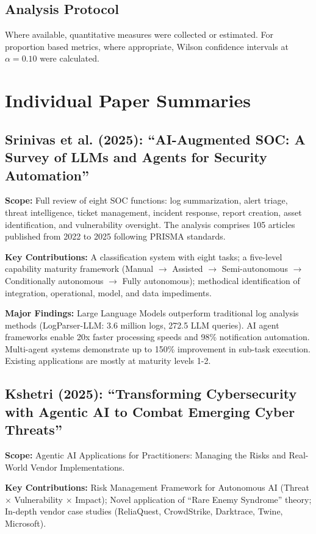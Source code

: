 \documentclass[journal]{IEEEtran}
\begin{document}
\subsection{Analysis Protocol}
Where available, quantitative measures were collected or estimated. For proportion based metrics, where appropriate, Wilson confidence intervals at $\alpha=0.10$ were calculated.

\section{Individual Paper Summaries}

\subsection{Srinivas et al. (2025): ``AI-Augmented SOC: A Survey of LLMs and Agents for Security Automation''}

\textbf{Scope:} Full review of eight SOC functions: log summarization, alert triage, threat intelligence, ticket management, incident response, report creation, asset identification, and vulnerability oversight. The analysis comprises 105 articles published from 2022 to 2025 following PRISMA standards.

\textbf{Key Contributions:} A classification system with eight tasks; a five-level capability maturity framework (Manual $\rightarrow$ Assisted $\rightarrow$ Semi-autonomous $\rightarrow$ Conditionally autonomous $\rightarrow$ Fully autonomous); methodical identification of integration, operational, model, and data impediments.

\textbf{Major Findings:} Large Language Models outperform traditional log analysis methods (LogParser-LLM: 3.6 million logs, 272.5 LLM queries). AI agent frameworks enable 20x faster processing speeds and 98\% notification automation. Multi-agent systems demonstrate up to 150\% improvement in sub-task execution. Existing applications are mostly at maturity levels 1-2.

\subsection{Kshetri (2025): ``Transforming Cybersecurity with Agentic AI to Combat Emerging Cyber Threats''}

\textbf{Scope:} Agentic AI Applications for Practitioners: Managing the Risks and Real-World Vendor Implementations.

\textbf{Key Contributions:} Risk Management Framework for Autonomous AI (Threat $\times$ Vulnerability $\times$ Impact); Novel application of ``Rare Enemy Syndrome'' theory; In-depth vendor case studies (ReliaQuest, CrowdStrike, Darktrace, Twine, Microsoft).
\end{document}
